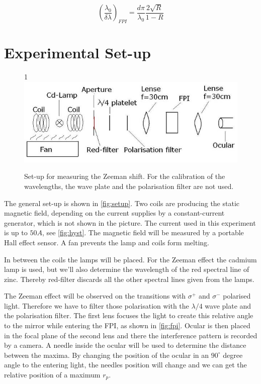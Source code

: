 \documentclass[]{article}
\begin{document}
\begin{equation}
\left(\frac{\lambda_0}{\delta\lambda}\right)_{FPI} = \frac{d\pi}{\lambda_0}\frac{2\sqrt{R}}{1-R}
\label{eq:resolving cap}
\end{equation}



\newpage
\section{Experimental Set-up}
\begin{figure}[H]1
\centering
\includegraphics[width=1\textwidth]{Plots/SetupZeeman.jpg}
\caption{Set-up for measuring the Zeeman shift. For the calibration of the wavelengths, the wave plate and the polarisation filter are not used.}
\label{fig:setup}
\end{figure}

The general set-up is shown in \autoref{fig:setup}. Two coils are producing the static magnetic field, depending on the current supplies by a constant-current generator, which is not shown in the picture. The current used in this experiment is up to $50 A$, see \autoref{fig:hyst}. The magnetic field will be measured by a portable Hall effect sensor. A fan prevents the lamp and coils form melting.

In between the coils the lamps will be placed. For the Zeeman effect the cadmium lamp is used, but we'll also determine the wavelength of the red spectral line of zinc. Thereby red-filter discards all the other spectral lines given from the lamps.

The Zeeman effect will be observed on the transitions with $\sigma^+$ and $\sigma^-$ polarised light. Therefore we have to filter those polarisation with the $\lambda/4$ wave plate and the polarisation filter. The first lens focuses the light to create this relative angle to the mirror while entering the FPI, as shown in \autoref{fig:fpi}. Ocular is then placed in the focal plane of the second lens and there the interference pattern is recorded by a camera. A needle inside the ocular will be used to determine the distance between the maxima. By changing the position of the ocular in an $90^\circ$ degree angle to the entering light, the needles position will change and we can get the relative position of a maximum $r_p$.
\end{document}
